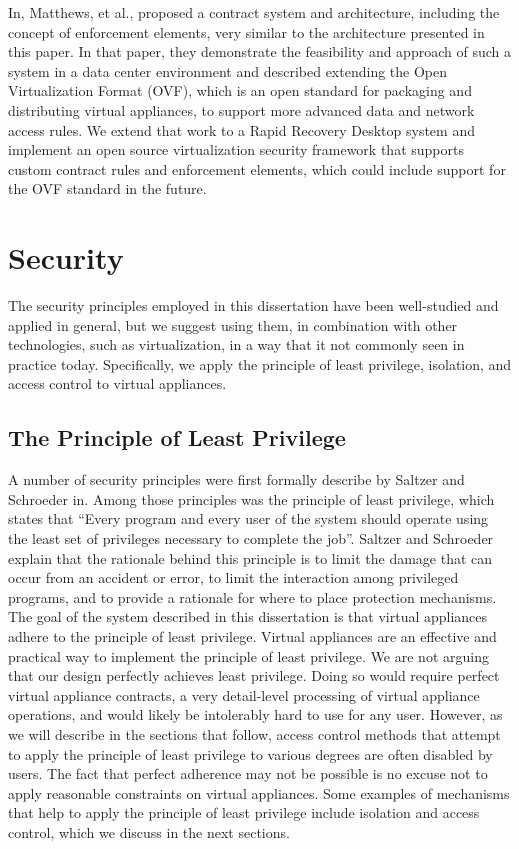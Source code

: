 In\cite{virtual_machine_contract_ICAC09}, Matthews, et al., proposed a contract system and architecture, including the concept of enforcement elements, very similar to the architecture presented in this paper. In that paper, they demonstrate the feasibility and approach of such a system in a data center environment and described extending the Open Virtualization Format (OVF)\cite{dmtf_newsletter}, which is an open standard for packaging and distributing virtual appliances, to support more advanced data and network access rules. We extend that work to a Rapid Recovery Desktop system and implement an open source virtualization security framework that supports custom contract rules and enforcement elements, which could include support for the OVF standard in the future.

\section{Security}

The security principles employed in this dissertation have been well-studied and applied in general, but we suggest using them, in combination with other technologies, such as virtualization, in a way that it not commonly seen in practice today. Specifically, we apply the principle of least privilege, isolation, and access control to virtual appliances.

\subsection{The Principle of Least Privilege}

A number of security principles were first formally describe by Saltzer and Schroeder in\cite{saltzer_1975}. Among those principles was the principle of least privilege, which states that ``Every program and every user of the system should operate using the least set of privileges necessary to complete the job''. Saltzer and Schroeder explain that the rationale behind this principle is to limit the damage that can occur from an accident or error, to limit the interaction among privileged programs, and to provide a rationale for where to place protection mechanisms. The goal of the system described in this dissertation is that virtual appliances adhere to the principle of least privilege. Virtual appliances are an effective and practical way to implement the principle of least privilege. We are not arguing that our design perfectly achieves least privilege. Doing so would require perfect virtual appliance contracts, a very detail-level processing of virtual appliance operations, and would likely be intolerably hard to use for any user. However, as we will describe in the sections that follow, access control methods that attempt to apply the principle of least privilege to various degrees are often disabled by users. The fact that perfect adherence may not be possible is no excuse not to apply reasonable constraints on virtual appliances. Some examples of mechanisms that help to apply the principle of least privilege include isolation and access control, which we discuss in the next sections.


